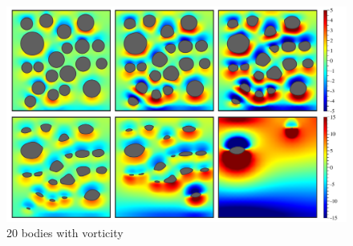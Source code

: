 \documentclass[preprint, 10pt]{elsarticle}
\begin{document}
\begin{figure}%
\begin{center}
\includegraphics[width = 0.9 \textwidth]{./figs/20bod.pdf}
\caption{20 bodies with vorticity}
\label{}
\end{center}
\end{figure}


\end{document}
